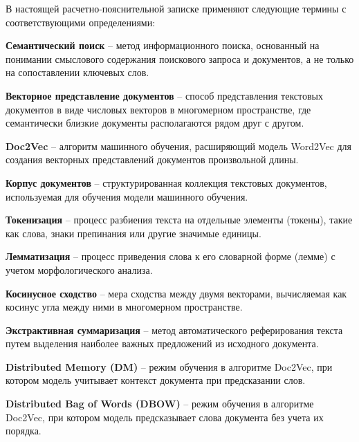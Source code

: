 
	
	В настоящей расчетно-пояснительной записке применяют следующие термины с соответствующими определениями:
	
	\textbf{Семантический поиск} – метод информационного поиска, основанный на понимании смыслового содержания поискового запроса и документов, а не только на сопоставлении ключевых слов.
	
	\textbf{Векторное представление документов} – способ представления текстовых документов в виде числовых векторов в многомерном пространстве, где семантически близкие документы располагаются рядом друг с другом.
	
	\textbf{Doc2Vec} – алгоритм машинного обучения, расширяющий модель Word2Vec для создания векторных представлений документов произвольной длины.
	
	\textbf{Корпус документов} – структурированная коллекция текстовых документов, используемая для обучения модели машинного обучения.
	
	\textbf{Токенизация} – процесс разбиения текста на отдельные элементы (токены), такие как слова, знаки препинания или другие значимые единицы.
	
	\textbf{Лемматизация} – процесс приведения слова к его словарной форме (лемме) с учетом морфологического анализа.
	
	\textbf{Косинусное сходство} – мера сходства между двумя векторами, вычисляемая как косинус угла между ними в многомерном пространстве.
	
	\textbf{Экстрактивная суммаризация} – метод автоматического реферирования текста путем выделения наиболее важных предложений из исходного документа.
	
	\textbf{Distributed Memory (DM)} – режим обучения в алгоритме Doc2Vec, при котором модель учитывает контекст документа при предсказании слов.
	
	\textbf{Distributed Bag of Words (DBOW)} – режим обучения в алгоритме Doc2Vec, при котором модель предсказывает слова документа без учета их порядка.
	
\clearpage